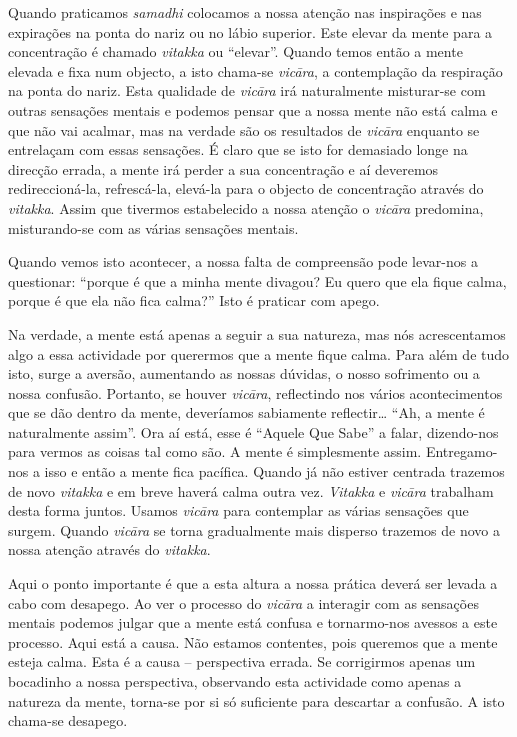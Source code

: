 Quando praticamos \emph{samadhi} colocamos a nossa atenção nas
inspirações e nas expirações na ponta do nariz ou no lábio superior.
Este elevar da mente para a concentração é chamado \emph{vitakka} ou
``elevar''. Quando temos então a mente elevada e fixa num objecto, a
isto chama-se \emph{vicāra}, a contemplação da respiração na ponta do
nariz. Esta qualidade de \emph{vicāra} irá naturalmente misturar-se com
outras sensações mentais e podemos pensar que a nossa mente não está
calma e que não vai acalmar, mas na verdade são os resultados de
\emph{vicāra} enquanto se entrelaçam com essas sensações. É claro que se
isto for demasiado longe na direcção errada, a mente irá perder a sua
concentração e aí deveremos redireccioná-la, refrescá-la, elevá-la para
o objecto de concentração através do \emph{vitakka}. Assim que tivermos
estabelecido a nossa atenção o \emph{vicāra} predomina, misturando-se
com as várias sensações mentais.

Quando vemos isto acontecer, a nossa falta de compreensão pode levar-nos
a questionar: ``porque é que a minha mente divagou? Eu quero que ela
fique calma, porque é que ela não fica calma?'' Isto é praticar com
apego.

Na verdade, a mente está apenas a seguir a sua natureza, mas nós
acrescentamos algo a essa actividade por querermos que a mente fique
calma. Para além de tudo isto, surge a aversão, aumentando as nossas
dúvidas, o nosso sofrimento ou a nossa confusão. Portanto, se houver
\emph{vicāra}, reflectindo nos vários acontecimentos que se dão dentro
da mente, deveríamos sabiamente reflectir\ldots{} ``Ah, a mente é
naturalmente assim''. Ora aí está, esse é ``Aquele Que Sabe'' a falar,
dizendo-nos para vermos as coisas tal como são. A mente é simplesmente
assim. Entregamo-nos a isso e então a mente fica pacífica. Quando já não
estiver centrada trazemos de novo \emph{vitakka} e em breve haverá calma
outra vez. \emph{Vitakka} e \emph{vicāra} trabalham desta forma juntos.
Usamos \emph{vicāra} para contemplar as várias sensações que surgem.
Quando \emph{vicāra} se torna gradualmente mais disperso trazemos de
novo a nossa atenção através do \emph{vitakka}.

Aqui o ponto importante é que a esta altura a nossa prática deverá ser
levada a cabo com desapego. Ao ver o processo do \emph{vicāra} a
interagir com as sensações mentais podemos julgar que a mente está
confusa e tornarmo-nos avessos a este processo. Aqui está a causa. Não
estamos contentes, pois queremos que a mente esteja calma. Esta é a
causa -- perspectiva errada. Se corrigirmos apenas um bocadinho a nossa
perspectiva, observando esta actividade como apenas a natureza da mente,
torna-se por si só suficiente para descartar a confusão. A isto chama-se
desapego.


